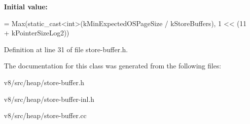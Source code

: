 {\bfseries Initial value\+:}
\begin{DoxyCode}
=
      Max(static\_cast<int>(kMinExpectedOSPageSize / kStoreBuffers),
          1 << (11 + kPointerSizeLog2))
\end{DoxyCode}


Definition at line 31 of file store-\/buffer.\+h.



The documentation for this class was generated from the following files\+:\begin{DoxyCompactItemize}
\item 
v8/src/heap/store-\/buffer.\+h\item 
v8/src/heap/store-\/buffer-\/inl.\+h\item 
v8/src/heap/store-\/buffer.\+cc\end{DoxyCompactItemize}

